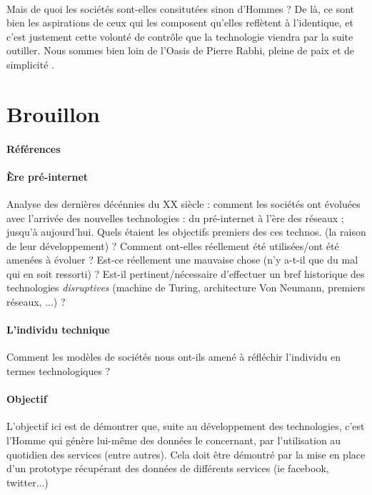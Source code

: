 \paragraph{} Mais de quoi les sociétés sont-elles consitutées sinon d'Hommes ? De là, ce sont bien les aspirations de
ceux qui les composent qu'elles reflètent à l'identique, et c'est justement cette volonté de contrôle que la technologie
viendra par la suite outiller. Nous sommes bien loin de l'Oasis de Pierre Rabhi, pleine de paix et de simplicité \cite{Rabhi1}.

\section*{Brouillon}

\paragraph{Références} \cite{Marx0} \cite{Marx1} \cite{Nietzsche0}

\paragraph{Ère pré-internet} Analyse des dernières décénnies du XX siècle :
comment les sociétés ont évoluées avec l'arrivée des nouvelles technologies : du
pré-internet à l'ère des réseaux ; jusqu'à aujourd'hui. Quels étaient les objectifs
premiers des ces technos. (la raison de leur développement) ? Comment ont-elles réellement
été utilisées/ont été amenées à évoluer ? Est-ce réellement une mauvaise chose (n'y
a-t-il que du mal qui en soit ressorti) ? Est-il pertinent/nécessaire d'effectuer un bref
historique des technologies \emph{disruptives} (machine de Turing, architecture
Von Neumann, premiers réseaux, ...) ?

\paragraph{L'individu technique} Comment les modèles de sociétés nous ont-ils amené à
réfléchir l'individu en termes technologiques ?

\paragraph{Objectif} L'objectif ici est de démontrer que, suite au développement des technologies, c'est l'Homme
qui génère lui-même des données le concernant, par l'utilisation au quotidien des services (entre autres).
Cela doit être démontré par la mise en place d'un prototype récupérant des données de différents
services (ie facebook, twitter...)

